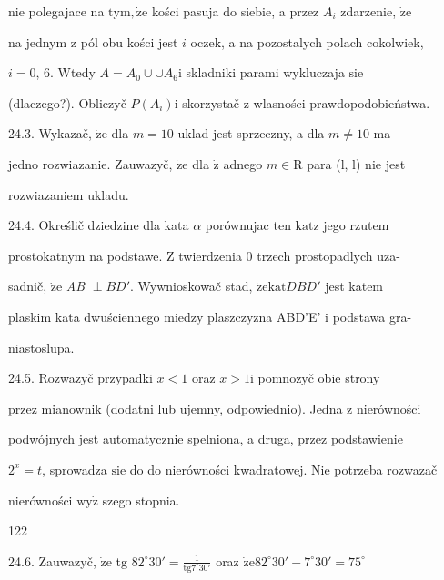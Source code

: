 \documentclass[a4paper,12pt]{article}
\begin{document}
nie polegajace na $\mathrm{t}\mathrm{y}\mathrm{m}, \dot{\mathrm{z}}\mathrm{e}$ kości pasuja do siebie, a przez $A_{i}$ zdarzenie, $\dot{\mathrm{z}}\mathrm{e}$

na jednym $\mathrm{z}$ pól obu kości jest $i$ oczek, a na pozostalych polach cokolwiek,

$i=0$, 6. Wtedy $ A=A_{0}\cup \cup A_{6} \mathrm{i}$ skladniki parami wykluczaja $\mathrm{s}\mathrm{i}\mathrm{e}$

(dlaczego?). Obliczyč $P(A_{i})\mathrm{i}$ skorzystač $\mathrm{z}$ wlasności prawdopodobieństwa.

24.3. Wykazač, $\dot{\mathrm{z}}\mathrm{e}$ dla $m=10$ uklad jest sprzeczny, a dla $m\neq 10$ ma

jedno rozwiazanie. Zauwazyč, $\dot{\mathrm{z}}\mathrm{e}$ dla $\dot{\mathrm{z}}$ adnego $m \in \mathrm{R}$ para (l, l) nie jest

rozwiazaniem ukladu.

24.4. Określič dziedzine dla kata $\alpha$ porównujac ten $\mathrm{k}\mathrm{a}\mathrm{t}\mathrm{z}$ jego rzutem

prostokatnym na podstawe. $\mathrm{Z}$ twierdzenia $0$ trzech prostopadlych uza-

sadnič, $\dot{\mathrm{z}}\mathrm{e}$ {\it AB} $\perp BD'$. Wywnioskowač stad, $\dot{\mathrm{z}}\mathrm{e} \mathrm{k}\mathrm{a}\mathrm{t} DBD'$ jest katem

plaskim kata dwuściennego miedzy plaszczyzna ABD'E' $\mathrm{i}$ podstawa gra-

niastoslupa.

24.5. Rozwazyč przypadki $x < 1$ oraz $x > 1 \mathrm{i}$ pomnozyč obie strony

przez mianownik (dodatni lub ujemny, odpowiednio). Jedna $\mathrm{z}$ nierówności

podwójnych jest automatycznie spelniona, a druga, przez podstawienie

$2^{x}=t$, sprowadza $\mathrm{s}\mathrm{i}\mathrm{e}$ do do nierówności kwadratowej. Nie potrzeba rozwazač

nierówności $\mathrm{w}\mathrm{y}\dot{\mathrm{z}}$ szego stopnia.





122

24.6. Zauwazyč, $\dot{\mathrm{z}}\mathrm{e}$ tg $82^{\circ}30' = \displaystyle \frac{1}{\mathrm{t}\mathrm{g}7^{\circ}30'}$ oraz $\dot{\mathrm{z}}\mathrm{e}82^{\circ}30'-7^{\circ}30' = 75^{\circ}$
\end{document}
